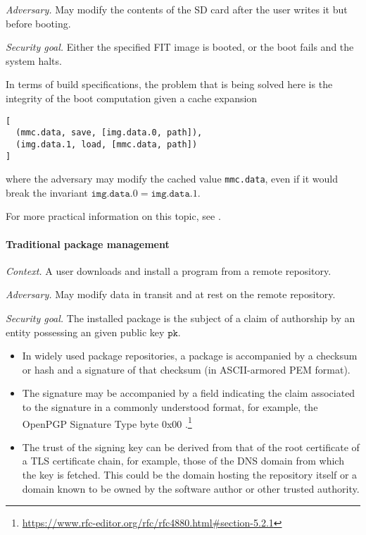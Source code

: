 \emph{Adversary.} May modify the contents of the SD card after the user writes it but before booting.

\emph{Security goal.} Either the specified FIT image is booted, or the boot fails and the system halts.


In terms of build specifications, the problem that is being solved here is the integrity of the boot computation given a cache expansion
\begin{verbatim}
[
  (mmc.data, save, [img.data.0, path]),
  (img.data.1, load, [mmc.data, path])
]
\end{verbatim}
where the adversary may modify the cached value \texttt{mmc.data}, even if it would break the invariant $\mathtt{img.data.0} = \mathtt{img.data.1}$.

For more practical information on this topic, see \cite{timesys2023securing}.

\hypertarget{traditional-package-management}{%
\paragraph{Traditional package
management}\label{traditional-package-management}}

\emph{Context.} A user downloads and install a program from a remote
repository.

\emph{Adversary.} May modify data in transit and at rest on the remote
repository.

\emph{Security goal.} The installed package is the subject of a claim of
authorship by an entity possessing an given public key \(\mathtt{pk}\).

\begin{itemize}
\tightlist
\item
  In widely used package repositories, a package is accompanied by a checksum or hash and a signature of that checksum (in ASCII-armored PEM format).
\item
  The signature may be accompanied by a field indicating the claim associated to the signature in a commonly understood format, for example, the OpenPGP Signature Type byte 0x00 \cite[\S5.2.1]{rfc4880}.\footnote{\url{https://www.rfc-editor.org/rfc/rfc4880.html\#section-5.2.1}}
\item
  The trust of the signing key can be derived from that of the root
  certificate of a TLS certificate chain, for example, those of the DNS
  domain from which the key is fetched. This could be the domain hosting
  the repository itself or a domain known to be owned by the software
  author or other trusted authority.
\end{itemize}

\printbibliography